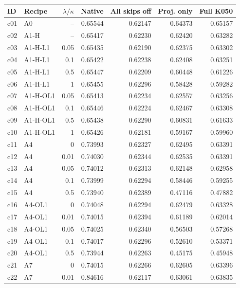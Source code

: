 \begin{tabular}{@{}llrrrrr@{}}
\toprule
ID & Recipe & $\lambda/\kappa$ & Native & All skips off & Proj. only & Full K050 \\
\midrule
c01 & A0 & -- & 0.65544 & 0.62147 & 0.64373 & 0.65157 \\
\addlinespace[2pt]
c02 & A1-H & -- & 0.65417 & 0.62230 & 0.62420 & 0.63282 \\
\addlinespace[2pt]
c03 & A1-H-L1 & 0.05 & 0.65435 & 0.62190 & 0.62375 & 0.63302 \\
c04 & A1-H-L1 & 0.1 & 0.65422 & 0.62238 & 0.62408 & 0.63251 \\
c05 & A1-H-L1 & 0.5 & 0.65447 & 0.62209 & 0.60448 & 0.61226 \\
c06 & A1-H-L1 & 1 & 0.65455 & 0.62296 & 0.58428 & 0.59282 \\
\addlinespace[2pt]
c07 & A1-H-OL1 & 0.05 & 0.65413 & 0.62234 & 0.62557 & 0.63256 \\
c08 & A1-H-OL1 & 0.1 & 0.65446 & 0.62224 & 0.62467 & 0.63308 \\
c09 & A1-H-OL1 & 0.5 & 0.65438 & 0.62290 & 0.60831 & 0.61633 \\
c10 & A1-H-OL1 & 1 & 0.65426 & 0.62181 & 0.59167 & 0.59960 \\
\addlinespace[2pt]
c11 & A4 & 0 & 0.73993 & 0.62327 & 0.62495 & 0.63391 \\
c12 & A4 & 0.01 & 0.74030 & 0.62344 & 0.62535 & 0.63391 \\
c13 & A4 & 0.05 & 0.74012 & 0.62313 & 0.62148 & 0.62958 \\
c14 & A4 & 0.1 & 0.73999 & 0.62294 & 0.58446 & 0.59255 \\
c15 & A4 & 0.5 & 0.73940 & 0.62389 & 0.47116 & 0.47882 \\
\addlinespace[2pt]
c16 & A4-OL1 & 0 & 0.74048 & 0.62294 & 0.62479 & 0.63328 \\
c17 & A4-OL1 & 0.01 & 0.74015 & 0.62394 & 0.61189 & 0.62014 \\
c18 & A4-OL1 & 0.05 & 0.74025 & 0.62340 & 0.56503 & 0.57268 \\
c19 & A4-OL1 & 0.1 & 0.74017 & 0.62296 & 0.52610 & 0.53371 \\
c20 & A4-OL1 & 0.5 & 0.73944 & 0.62263 & 0.45175 & 0.45948 \\
\addlinespace[2pt]
c21 & A7 & 0 & 0.74015 & 0.62266 & 0.62605 & 0.63396 \\
c22 & A7 & 0.01 & 0.84616 & 0.62117 & 0.63061 & 0.63835 \\

\end{tabular}
